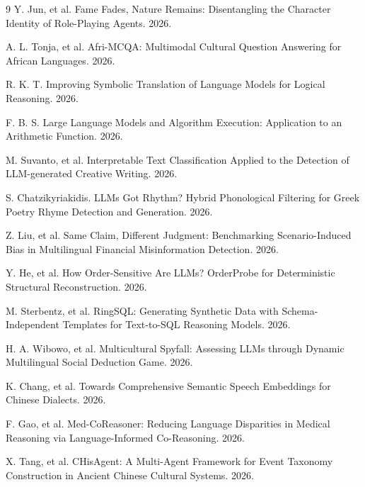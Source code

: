 \documentclass{article}
\begin{document}
\begin{thebibliography}{9}
Y. Jun, et al. Fame Fades, Nature Remains: Disentangling the Character Identity of Role-Playing Agents. 2026.

A. L. Tonja, et al. Afri-MCQA: Multimodal Cultural Question Answering for African Languages. 2026.

R. K. T. Improving Symbolic Translation of Language Models for Logical Reasoning. 2026.

F. B. S. Large Language Models and Algorithm Execution: Application to an Arithmetic Function. 2026.

M. Suvanto, et al. Interpretable Text Classification Applied to the Detection of LLM-generated Creative Writing. 2026.

S. Chatzikyriakidis. LLMs Got Rhythm? Hybrid Phonological Filtering for Greek Poetry Rhyme Detection and Generation. 2026.

Z. Liu, et al. Same Claim, Different Judgment: Benchmarking Scenario-Induced Bias in Multilingual Financial Misinformation Detection. 2026.

Y. He, et al. How Order-Sensitive Are LLMs? OrderProbe for Deterministic Structural Reconstruction. 2026.

M. Sterbentz, et al. RingSQL: Generating Synthetic Data with Schema-Independent Templates for Text-to-SQL Reasoning Models. 2026.

H. A. Wibowo, et al. Multicultural Spyfall: Assessing LLMs through Dynamic Multilingual Social Deduction Game. 2026.

K. Chang, et al. Towards Comprehensive Semantic Speech Embeddings for Chinese Dialects. 2026.

F. Gao, et al. Med-CoReasoner: Reducing Language Disparities in Medical Reasoning via Language-Informed Co-Reasoning. 2026.

X. Tang, et al. CHisAgent: A Multi-Agent Framework for Event Taxonomy Construction in Ancient Chinese Cultural Systems. 2026.


\end{thebibliography}
\end{document}
